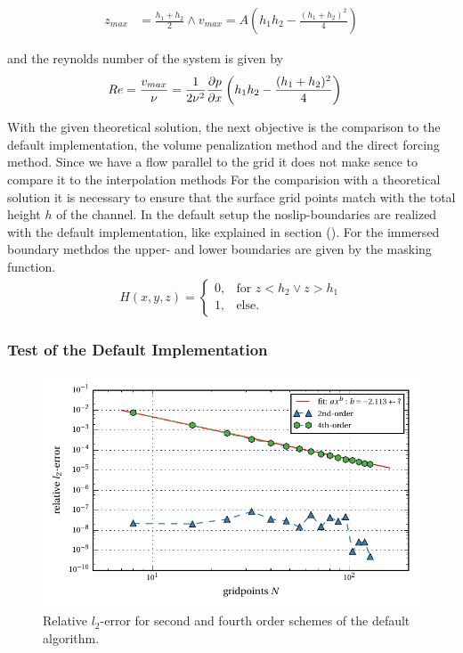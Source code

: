 \begin{align}
z_{max} &= \frac{h_1+h_2}{2} \wedge v_{max} = A\left(h_1h_2 - \frac{(h_1 + h_2)^2}{4}\right)
\end{align}

and the reynolds number of the system is given by
\begin{align}
    Re &= \frac{v_{max} }{\nu} = \frac{1}{2\nu^2}\pdn[p]{x}\left(h_1h_2 - \frac{(h_1 + h_2)^2}{4}\right)
\end{align}



With the given theoretical solution, the next objective is the comparison
to the default implementation, the volume penalization method and the direct forcing method.
Since we have a flow parallel to the grid  it does not make sence to compare it to the interpolation methods
For the comparision with a theoretical solution it is necessary to ensure that the surface grid points match with the total height $h$ of the channel.
In the default setup the noslip-boundaries are realized with the default implementation, like explained in section ().
For the immersed boundary methdos the upper- and lower boundaries are given by the masking function.
\begin{align}
H(x, y, z) = \begin{cases}
                    0, & \text{for \  }  z < h_2 \lor z>h_1 \\
                    1, & \text{else}.
             \end{cases}
\end{align}

\subsubsection{Test of the Default Implementation}

\begin{figure}[!bp]
    \centering
    \includegraphics{gfx/immersed_boundary/1_default/relative_l2error.pdf}
    \caption{Relative $l_2$-error for second and fourth order schemes of the default algorithm.\label{fig:ema1}}
\end{figure}

